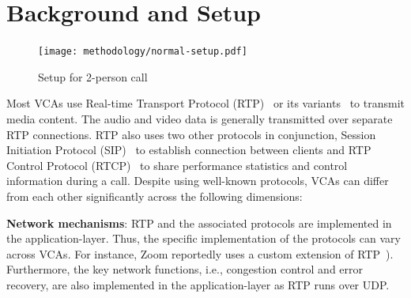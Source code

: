 \section{Background and Setup}

\begin{figure}[h]
\centering
\texttt{[image: methodology/normal-setup.pdf]}
\caption{Setup for 2-person call}
\label{fig:static_setup}
\end{figure}


\label{sec:background}
Most VCAs use Real-time Transport Protocol (RTP)~\cite{schulzrinne1996rtp, schulzrinne2003rfc3550} or its variants~\cite{baugher2004secure, zoom_rtp} to transmit media content. The audio and video data is generally transmitted over separate RTP connections. RTP also uses two other protocols in conjunction, Session Initiation Protocol (SIP)~\cite{rosenberg2002sip} to establish connection between clients and RTP Control Protocol (RTCP)~\cite{schulzrinne2003rfc3550} to share performance statistics and control information during a call. Despite using well-known protocols, VCAs can differ from each other significantly across the following dimensions:



\textbf{Network mechanisms}: RTP and the associated protocols are implemented in the application-layer. Thus, the specific implementation of the protocols can vary across VCAs. For instance, Zoom reportedly uses a custom extension of RTP~\cite{zoom_rtp}). Furthermore, the key network functions, i.e., congestion control and error recovery, are also implemented in the application-layer as RTP runs over UDP.

